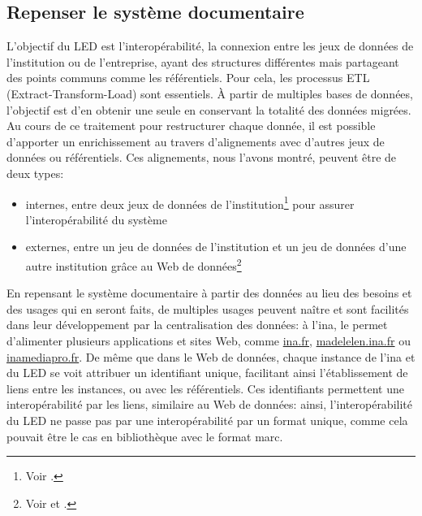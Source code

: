 \subsection{\label{III-B-1-b}Repenser le système documentaire}

L'objectif du LED est l'interopérabilité, la connexion entre les jeux de données de l'institution ou de l'entreprise, ayant des structures différentes mais partageant des points communs comme les référentiels. Pour cela, les processus ETL (Extract-Transform-Load) sont essentiels. À partir de multiples bases de données, l'objectif est d'en obtenir une seule en conservant la totalité des données migrées. Au cours de ce traitement pour restructurer chaque donnée, il est possible d'apporter un enrichissement au travers d'alignements avec d'autres jeux de données ou référentiels. Ces alignements, nous l'avons montré, peuvent être de deux types:
\begin{itemize}
	\item internes, entre deux jeux de données de l'institution\footnote{Voir .} pour assurer l'interopérabilité du système
	\item externes, entre un jeu de données de l'institution et un jeu de données d'une autre institution grâce au Web de données\footnote{Voir  et .}
\end{itemize}
\medskip

En repensant le système documentaire à partir des données au lieu des besoins et des usages qui en seront faits, de multiples usages peuvent naître et sont facilités dans leur développement par la centralisation des données: à l'\ac{ina}, le \ldd permet d'alimenter plusieurs applications et sites Web, comme \href{https://www.ina.fr//}{ina.fr}, \href{https://madelen.ina.fr/}{madelelen.ina.fr} ou \href{https://www.inamediapro.com}{inamediapro.fr}. De même que dans le Web de données,  chaque instance de l'\ac{ina} et du LED se voit attribuer un identifiant unique, facilitant ainsi l'établissement de liens entre les instances, ou avec les référentiels. Ces identifiants permettent une interopérabilité par les liens, similaire au Web de données: ainsi, l'interopérabilité du LED ne passe pas par une interopérabilité par un format unique, comme cela pouvait être le cas en bibliothèque avec le format \ac{marc}.

